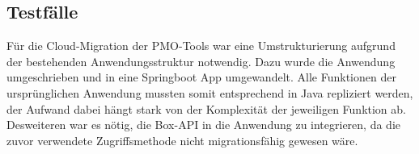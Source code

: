 \subsection{Testfälle}

Für die Cloud-Migration der PMO-Tools war eine Umstrukturierung aufgrund der bestehenden Anwendungsstruktur notwendig. Dazu wurde die Anwendung umgeschrieben und in eine Springboot App umgewandelt. Alle Funktionen der ursprünglichen Anwendung mussten somit entsprechend in Java repliziert werden, der Aufwand dabei hängt stark von der Komplexität der jeweiligen Funktion ab. Desweiteren war es nötig, die Box-\ac{API} in die Anwendung zu integrieren, da die zuvor verwendete Zugriffsmethode nicht migrationsfähig gewesen wäre.